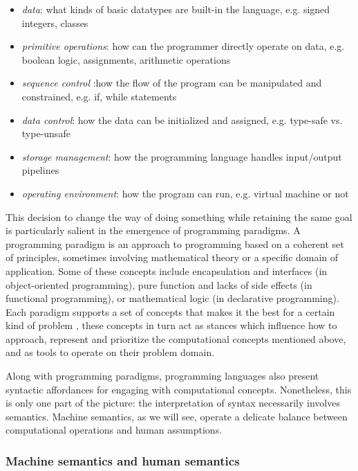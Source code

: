 \begin{itemize}
  \item{\emph{data}: what kinds of basic datatypes are built-in the language, e.g. signed integers, classes}
  \item{\emph{primitive operations}: how can the programmer directly operate on data, e.g. boolean logic, assignments, arithmetic operations}
  \item{\emph{sequence control} :how the flow of the program can be manipulated and constrained, e.g. if, while statements}
  \item{\emph{data control}: how the data can be initialized and assigned, e.g. type-safe vs. type-unsafe}
  \item{\emph{storage management}: how the programming language handles input/output pipelines}
  \item{\emph{operating environment}: how the program can run, e.g. virtual machine or not}
\end{itemize}

This decision to change the way of doing something while retaining the same goal is particularly salient in the emergence of programming paradigms. A programming paradigm is an approach to programming based on a coherent set of principles, sometimes involving mathematical theory or a specific domain of application. Some of these concepts include encapsulation and interfaces (in object-oriented programming), pure function and lacks of side effects (in functional programming), or mathematical logic (in declarative programming). Each paradigm supports a set of concepts that makes it the best for a certain kind of problem \citep{vanroy_programming_2012}, these concepts in turn act as stances which influence how to approach, represent and prioritize the computational concepts mentioned above, and as tools to operate on their problem domain.

Along with programming paradigms, programming languages also present syntactic affordances for engaging with computational concepts. Nonetheless, this is only one part of the picture: the interpretation of syntax necessarily involves semantics. Machine semantics, as we will see, operate a delicate balance between computational operations and human assumptions.

\subsubsection{Machine semantics and human semantics}
\label{subsubsec:machine-semantics-human-semantics}

